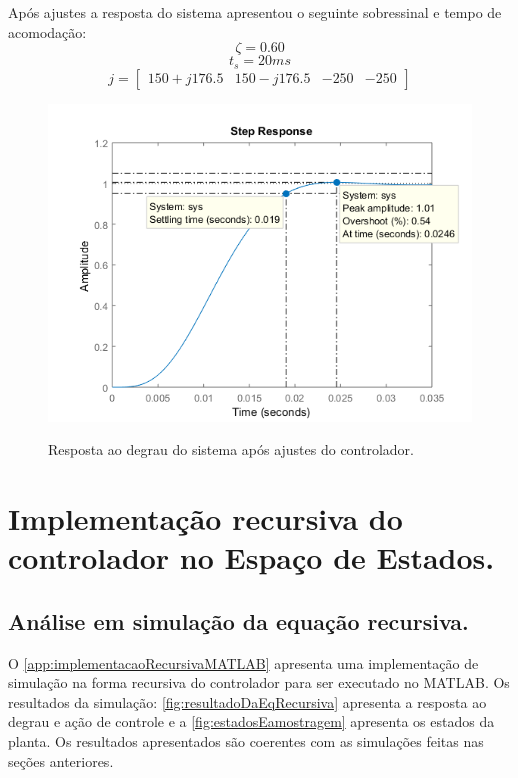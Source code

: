 \documentclass[
	article,			%
	11pt,				%
	oneside,			%
	a4paper,			%
	english,			%
	brazil,				%
	sumario=tradicional
	]{abntex2}
\begin{document}
Após ajustes a resposta do sistema apresentou o seguinte sobressinal e tempo de acomodação:
$$
\zeta = 0.60
$$
$$
t_s = 20 ms
$$
$$
j=
\left[
\begin{array}{cccc}
150+j176.5 &  150-j176.5 & -250 & -250
\end{array}
\right]
$$
\begin{figure}[htb!]
	\centering
	\caption{Resposta ao degrau do sistema após ajustes do controlador.}
	\includegraphics[scale=0.8]{./img/respStepAjusts.png}
	\label{fig:respStepAjusts}
\end{figure}

\pagebreak

\section{\textbf{Implementação recursiva do controlador no Espaço de Estados.}}

\subsection{Análise em simulação da equação recursiva.}

O \autoref{app:implementacaoRecursivaMATLAB} apresenta uma implementação de simulação na forma recursiva do controlador para ser executado no MATLAB. 
Os resultados da simulação: \autoref{fig:resultadoDaEqRecursiva} apresenta a resposta ao degrau e ação de controle e a \autoref{fig:estadosEamostragem} apresenta os estados da planta. Os resultados apresentados são coerentes com as simulações feitas nas seções anteriores.
\end{document}
